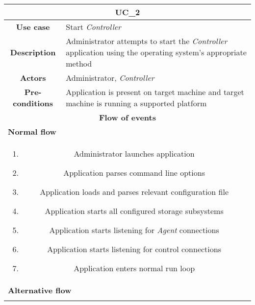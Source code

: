             \vspace{0.5cm}
            \noindent
            \begin{longtable}{ |c|p{11.8cm}| }
                \hline
                \multicolumn{2}{|c|}{\cellcolor{lime} \textbf{UC\_2}}\\ \hline
                \cellcolor[gray]{0.9} \textbf{Use case} & Start \textit{Controller}\\ \hline
                \cellcolor[gray]{0.9} \textbf{Description} & Administrator attempts to start the \textit{Controller} application using the operating system's appropriate method\\ \hline
                \cellcolor[gray]{0.9} \textbf{Actors} & Administrator, \textit{Controller}\\ \hline
                \cellcolor[gray]{0.9} \textbf{Pre-conditions} & Application is present on target machine and target machine is running a supported platform\\ \hline
                \multicolumn{2}{|c|}{\cellcolor[gray]{0.9} \textbf{Flow of events}}\\ \hline
                \multicolumn{2}{|l|}{\cellcolor[gray]{0.9} \textbf{Normal flow}}\\ \hline
                \multicolumn{2}{|p{14cm}|}{
                    \begin{enumerate}
                        \item Administrator launches application
                        \item Application parses command line options
                        \item Application loads and parses relevant configuration file
                        \item Application starts all configured storage subsystems
                        \item Application starts listening for \textit{Agent} connections
                        \item Application starts listening for control connections
                        \item Application enters normal run loop
                    \end{enumerate}
                }\\ \hline
                \multicolumn{2}{|l|}{\cellcolor[gray]{0.9} \textbf{Alternative flow}}\\ \hline
                \multicolumn{2}{|p{14cm}|}{
                    \begin{itemize}

\end{itemize}}
\end{longtable}
